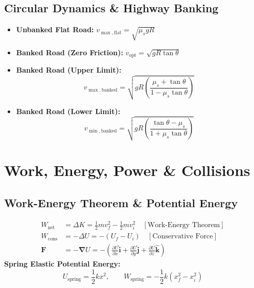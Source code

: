 \documentclass[10pt,twoside,openright]{book}
\begin{document}
\subsection{Circular Dynamics \& Highway Banking}

\begin{formulabox}
\begin{itemize}[leftmargin=1.2em, itemsep=2pt]
  \item \textbf{Unbanked Flat Road:} $v_{\max,\text{flat}} = \sqrt{\mu_s g R}$
  \item \textbf{Banked Road (Zero Friction):} $v_{\text{opt}} = \sqrt{g R \tan\theta}$
  \item \textbf{Banked Road (Upper Limit):}
  \[
    v_{\max,\text{banked}} = \sqrt{g R \left(\frac{\mu_s + \tan\theta}{1 - \mu_s\tan\theta}\right)}
  \]
  \item \textbf{Banked Road (Lower Limit):}
  \[
    v_{\min,\text{banked}} = \sqrt{g R \left(\frac{\tan\theta - \mu_s}{1 + \mu_s\tan\theta}\right)}
  \]
\end{itemize}
\end{formulabox}

\newpage

\section{Work, Energy, Power \& Collisions}

\subsection{Work-Energy Theorem \& Potential Energy}

\begin{formulabox}
\begin{align}
  W_{\text{net}} &= \Delta K = \frac{1}{2}m v_f^2 - \frac{1}{2}m v_i^2 \quad [\text{Work-Energy Theorem}] \\
  W_{\text{cons}} &= -\Delta U = -(U_f - U_i) \quad [\text{Conservative Force}] \\
  \mathbf{F} &= -\boldsymbol{\nabla} U = -\left(\frac{\partial U}{\partial x}\hat{\mathbf{i}} + \frac{\partial U}{\partial y}\hat{\mathbf{j}} + \frac{\partial U}{\partial z}\hat{\mathbf{k}}\right)
\end{align}
\textbf{Spring Elastic Potential Energy:}
\begin{equation}
  U_{\text{spring}} = \frac{1}{2}k x^2, \qquad W_{\text{spring}} = -\frac{1}{2}k(x_f^2 - x_i^2)
\end{equation}
\end{formulabox}
\end{document}
